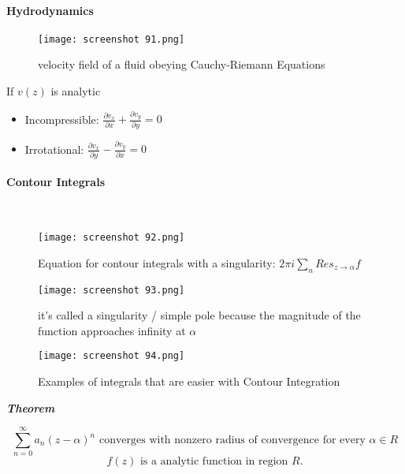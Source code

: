 \documentclass[svgnames]{article}   	%
\begin{document}
\paragraph{Hydrodynamics} 

\begin{figure}[H]
  \centering
    \texttt{[image: screenshot 91.png]}
    \caption{velocity field of a fluid obeying Cauchy-Riemann Equations}
\end{figure}



If $v(z)$ is analytic 

\begin{itemize}
  \item Incompressible: $ \frac{\partial v_x}{\partial x}  + \frac{\partial
    v_y}{\partial y} = 0$ 
  \item Irrotational: $ \frac{\partial v_x}{\partial y} - \frac{\partial
    v_y}{\partial x} = 0$
\end{itemize}


\paragraph{Contour Integrals}
\mbox{}\\
\begin{figure}[H]
  \centering
    \texttt{[image: screenshot 92.png]}
    \caption{Equation for contour integrals with a singularity: $2\pi i \sum_n
    Res_{z \to \alpha} f$}
\end{figure}



\begin{figure}[H]
  \centering
    \texttt{[image: screenshot 93.png]}
    \caption{it's called a singularity / simple pole because the magnitude of
    the function approaches infinity at $\alpha$}
\end{figure}



\begin{figure}[H]
  \centering
    \texttt{[image: screenshot 94.png]}
    \caption{Examples of integrals that are easier with Contour Integration}
\end{figure}


\textit{ \textbf{Theorem}} 

\[
\sum_{n=0}^{\infty} a_n (z-\alpha)^n \text{ converges with nonzero radius of
convergence for every $\alpha \in R$}
\]
\[
f(z) \text{ is a analytic function in region } R. 
\]
\end{document}
